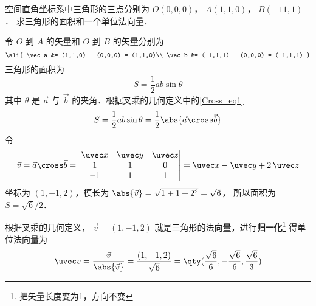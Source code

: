 \begin{exam}{}
空间直角坐标系中三角形的三点分别为 $O(0,0,0)$，  $A(1,1,0)$，  $B(-11,1)$． 求三角形的面积和一个单位法向量．

令 $O$ 到 $A$ 的矢量和  $O$ 到 $B$ 的矢量分别为
\begin{equation}
\ali{
\vec a  &= (1,1,0) - (0,0,0) = (1,1,0)\\
\vec b  &= (-1,1,1) - (0,0,0) = (-1,1,1)
}\end{equation}
三角形的面积为
 \begin{equation}
S = \frac12 ab \sin \theta 
\end{equation}
其中 $\theta $ 是 $\vec a$ 与 $\vec b$ 的夹角．根据叉乘的几何定义中的\autoref{Cross_eq1}
\begin{equation}
S = \frac 12 ab \sin \theta  = \frac 12 \abs{\vec a\cross\vec b}
\end{equation}
令
\begin{equation}
\vec v = \vec a \cross \vec b = 
\begin{vmatrix} \uvec x & \uvec y & \uvec z \\ 1&1&0\\-1&1&1 \end{vmatrix}
= \uvec x - \uvec y + 2\,\uvec z 
\end{equation}
坐标为 $(1,-1,2)$，模长为 $\abs{\vec v} = \sqrt{1 + 1 + 2^2} = \sqrt 6$， 所以面积为 $S = \sqrt 6 /2$． 

根据叉乘的几何定义， $\vec v = (1,-1,2)$ 就是三角形的法向量，进行\textbf{归一化}\footnote{把矢量长度变为1，方向不变}
得单位法向量为
 \begin{equation}
\uvec v = \frac{\vec v}{\abs{\vec v}} = \frac{(1,-1,2)}{\sqrt 6} = \qty( \frac{\sqrt 6 }{6}, - \frac{\sqrt 6 }{6}, \frac{\sqrt 6 }{3} )
\end{equation}
\end{exam}



